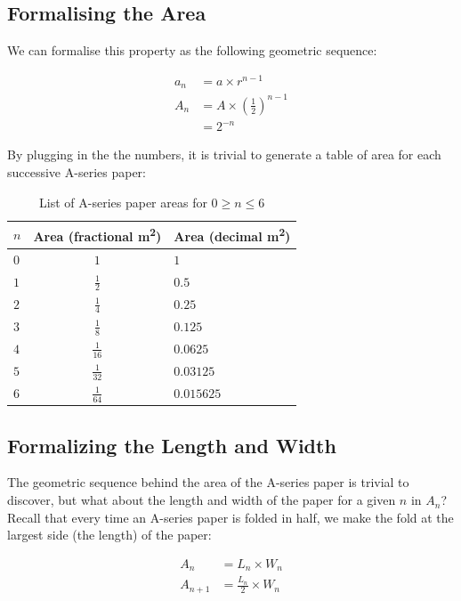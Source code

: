 \subsection*{Formalising the Area}
We can formalise this property as the following geometric sequence:

\begin{align*}
  a_{n} &= a \times r^{n - 1} \\
  A_{n} &= A \times \left(\frac{1}{2}\right)^{n -1} \\
        &= 2^{-n}
\end{align*}

\noindent
By plugging in the the numbers, it is trivial to generate a table of area for each successive A-series paper:

\begin{table}[h]
  \centering\makegapedcells
    \begin{tabular}{@{}lcl@{}}
    \toprule
    $n$ & Area (fractional \si{\meter\squared}) & Area (decimal \si{\meter\squared}) \\ \midrule
    $0$ & $1$               & $1$              \\
    $1$ & $\frac{1}{2}$     & $0.5$            \\
    $2$ & $\frac{1}{4}$     & $0.25$           \\
    $3$ & $\frac{1}{8}$     & $0.125$          \\
    $4$ & $\frac{1}{16}$    & $0.0625$         \\
    $5$ & $\frac{1}{32}$    & $0.03125$        \\
    $6$ & $\frac{1}{64}$    & $0.015625$       \\ \bottomrule
  \end{tabular}
  \caption{List of A-series paper areas for $0 \geq n \leq 6$}
  \label{tab:area}
\end{table}

\subsection*{Formalizing the Length and Width}
The geometric sequence behind the area of the A-series paper is trivial to discover, but what about the length and width of the paper for a given $n$ in $A_{n}$? Recall that every time an A-series paper is folded in half, we make the fold at the largest side (the length) of the paper:

\begin{align*}
  A_{n}     &= L_{n} \times W_{n} \\
  A_{n + 1} &= \frac{L_{n}}{2} \times W_{n}
\end{align*}

